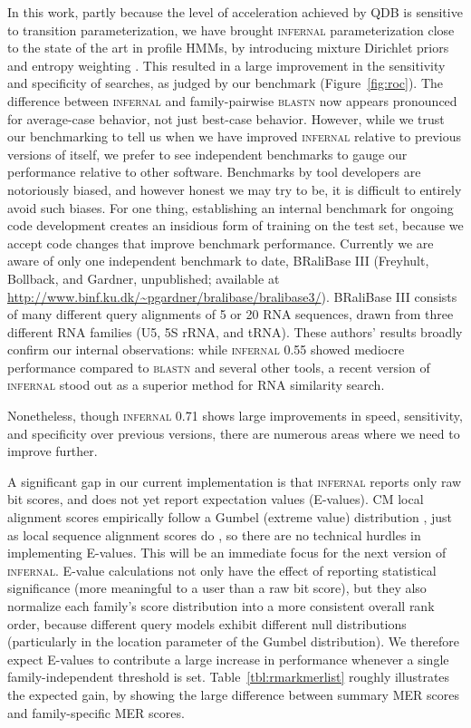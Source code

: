 \documentclass[11pt]{article}
\begin{document}
In this work, partly because the level of acceleration achieved by QDB
is sensitive to transition parameterization, we have brought
\textsc{infernal} parameterization close to the state of the art in
profile HMMs, by introducing mixture Dirichlet priors
\cite{Sjolander96} and entropy weighting \cite{Karplus98}. This
resulted in a large improvement in the sensitivity and specificity of
searches, as judged by our benchmark (Figure~\ref{fig:roc}). The
difference between \textsc{infernal} and family-pairwise
\textsc{blastn} now appears pronounced for average-case behavior, not
just best-case behavior. However, while we trust our benchmarking to
tell us when we have improved \textsc{infernal} relative to previous
versions of itself, we prefer to see independent benchmarks to gauge
our performance relative to other software. Benchmarks by tool
developers are notoriously biased, and however honest we may try to
be, it is difficult to entirely avoid such biases. For one thing,
establishing an internal benchmark for ongoing code development
creates an insidious form of training on the test set, because we
accept code changes that improve benchmark performance.  Currently we
are aware of only one independent benchmark to date, BRaliBase III
(Freyhult, Bollback, and Gardner, unpublished; available at
\url{http://www.binf.ku.dk/~pgardner/bralibase/bralibase3/}). BRaliBase
III consists of many different query alignments of 5 or 20 RNA
sequences, drawn from three different RNA families (U5, 5S rRNA, and
tRNA). These authors' results broadly confirm our internal
observations: while \textsc{infernal} 0.55 showed mediocre performance
compared to \textsc{blastn} and several other tools, a recent version
of \textsc{infernal} stood out as a superior method for RNA similarity
search.

Nonetheless, though \textsc{infernal} 0.71 shows large improvements in
speed, sensitivity, and specificity over previous versions, there are
numerous areas where we need to improve further. 

A significant gap in our current implementation is that
\textsc{infernal} reports only raw bit scores, and does not yet report
expectation values (E-values). CM local alignment scores empirically
follow a Gumbel (extreme value) distribution \cite{KleinEddy03}, just
as local sequence alignment scores do \cite{KarlinAltschul93}, so
there are no technical hurdles in implementing E-values. This will be
an immediate focus for the next version of \textsc{infernal}.  E-value
calculations not only have the effect of reporting statistical
significance (more meaningful to a user than a raw bit score), but
they also normalize each family's score distribution into a more
consistent overall rank order, because different query models exhibit
different null distributions (particularly in the location parameter
of the Gumbel distribution). We therefore expect E-values to
contribute a large increase in performance whenever a single
family-independent threshold is set. Table~\ref{tbl:rmarkmerlist}
roughly illustrates the expected gain, by showing the large difference
between summary MER scores and family-specific MER scores.
\end{document}
